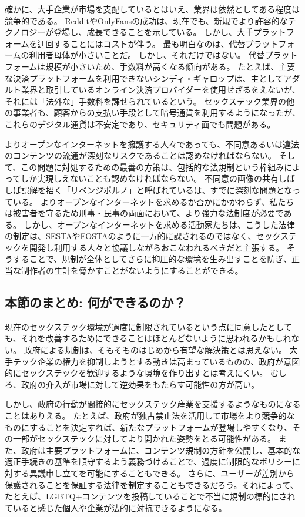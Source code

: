 \documentclass[paper=a4,book,openany]{jlreq} \usepackage{mystyle}
\begin{document}
確かに、大手企業が市場を支配しているとはいえ、業界は依然としてある程度は競争的である。
RedditやOnlyFansの成功は、現在でも、新規でより許容的なテクノロジーが登場し、成長できることを示している。
しかし、大手プラットフォームを迂回することにはコストが伴う。
最も明白なのは、代替プラットフォームの利用者母体が小さいことだ。
しかし、それだけではない。
代替プラットフォームは規模が小さいため、手数料が高くなる傾向がある。
たとえば、主要な決済プラットフォームを利用できないシンディ・ギャロップは、主としてアダルト業界と取引しているオンライン決済プロバイダーを使用せざるをえないが、それには「法外な」手数料を課せられているという。
セックステック業界の他の事業者も、顧客からの支払い手段として暗号通貨を利用するようになったが、これらのデジタル通貨は不安定であり、セキュリティ面でも問題がある。

よりオープンなインターネットを擁護する人々であっても、不同意あるいは違法のコンテンツの流通が深刻なリスクであることは認めなければならない。
そして、この問題に対処するための最善の方策は、包括的な法規制という枠組みによってしか実現しえないことも認めなければならない。
不同意の画像の共有{\DDASH}しばしば誤解を招く「リベンジポルノ」と呼ばれている{\DDASH}は、すでに深刻な問題となっている。
よりオープンなインターネットを求めるか否かにかかわらず、私たちは被害者を守るため刑事・民事の両面において、より強力な法制度が必要である\citep{kibbe20:_faceb_has_banned_ads_kink}。
しかし、オープンなインターネットを求める活動家たちは、こうした法律の制定は、SESTAやFOSTAのように一方的に課されるのではなく、セックステックを開発し利用する人々と協議しながらおこなわれるべきだと主張する。
そうすることで、規制が全体としてさらに抑圧的な環境を生み出すことを防ぎ、正当な制作者の生計を脅かすことがないようにすることができる。

\subsection{本節のまとめ: 何ができるのか？}

現在のセックステック環境が過度に制限されているという点に同意したとしても、それを改善するためにできることはほとんどないように思われるかもしれない。
政府による規制は、そもそものはじめから有望な解決策とは思えない。
大手テック企業の権力を抑制しようとする動きは高まっているものの、政府が意図的にセックステックを歓迎するような環境を作り出すとは考えにくい。
むしろ、政府の介入が市場に対して逆効果をもたらす可能性の方が高い。

しかし、政府の行動が間接的にセックステック産業を支援するようなものになることはありえる。
たとえば、政府が独占禁止法を活用して市場をより競争的なものにすることを決定すれば、新たなプラットフォームが登場しやすくなり、その一部がセックステックに対してより開かれた姿勢をとる可能性がある。
また、政府は主要プラットフォームに、コンテンツ規制の方針を公開し、基本的な適正手続きの基準を順守するよう義務づけることで、過度に制限的なポリシーに対する異議申し立てを可能にすることもできる。
さらに、ユーザーが差別から保護されることを保証する法律を制定することもできるだろう。それによって、たとえば、LGBTQ+コンテンツを投稿していることで不当に規制の標的にされていると感じた個人や企業が法的に対抗できるようになる。
\end{document}
